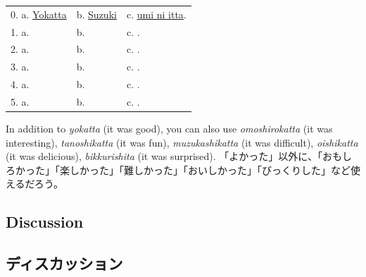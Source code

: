 \documentclass[uplatex,dvipdfmx,b5paper,english,10pt]{jsbook}
\begin{document}
\begin{tabular}[t]{lll}
 0. a. \underline{ Yokatta \hspace{3.5zw}}
 &  b. \underline{ Suzuki\hspace{4.8zw}}
 &  c. \underline{ umi ni itta\hspace{4.5zw}}.\\
 1. a. \underline{\hspace{8zw}}& b. \underline{\hspace{8zw}} & c. \underline{\hspace{10zw}}.\\
 2. a. \underline{\hspace{8zw}}& b. \underline{\hspace{8zw}} & c. \underline{\hspace{10zw}}.\\
 3. a. \underline{\hspace{8zw}}& b. \underline{\hspace{8zw}} & c. \underline{\hspace{10zw}}.\\
 4. a. \underline{\hspace{8zw}}& b. \underline{\hspace{8zw}} & c. \underline{\hspace{10zw}}.\\
 5. a. \underline{\hspace{8zw}}& b. \underline{\hspace{8zw}} & c. \underline{\hspace{10zw}}.\\
\end{tabular}

\begin{toianswer}
\ifEnglish
In addition to {\it yokatta\/} (it was good), you can also use {\it omoshirokatta\/} (it was interesting), {\it tanoshikatta\/} (it was fun), {\it muzukashikatta\/} (it was difficult), {\it oishikatta\/} (it was delicious), {\it bikkurishita\/} (it was surprised).
\else
「よかった」以外に、「おもしろかった」「楽しかった」「難しかった」「おいしかった」「びっくりした」など使えるだろう。
\fi
\end{toianswer}


\ifEnglish
\subsection{Discussion}
\else
\subsection{ディスカッション}
\fi
\end{document}
